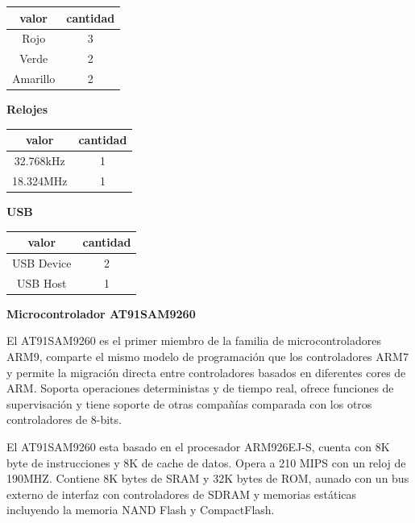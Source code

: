 \begin{center}
\begin{tabular}{|c|c|}
\hline
\hline
\normalsize valor & \normalsize cantidad\\
\hline
\normalsize Rojo & \normalsize 3\\
\hline
\normalsize Verde & \normalsize 2\\
\hline
\normalsize Amarillo & \normalsize 2\\
\hline
\end{tabular}
\end{center}

\textbf{Relojes}

\begin{center}
\begin{tabular}{|c|c|}
\hline
\hline
\normalsize valor & \normalsize cantidad\\
\hline
\normalsize 32.768kHz & \normalsize 1\\
\hline
\normalsize 18.324MHz & \normalsize 1\\
\hline
\end{tabular}
\end{center}

\textbf{USB}

\begin{center}
\begin{tabular}{|c|c|}
\hline
\hline
\normalsize valor & \normalsize cantidad\\
\hline
\normalsize USB Device & \normalsize 2\\
\hline
\normalsize USB Host & \normalsize 1\\
\hline
\end{tabular}
\end{center}

\textbf{Microcontrolador AT91SAM9260}\medskip

El AT91SAM9260 es el primer miembro de la familia de microcontroladores ARM9, comparte el mismo modelo de programación que los controladores ARM7 y permite la migración directa entre controladores basados en diferentes cores de ARM.  Soporta operaciones deterministas y de tiempo real, ofrece funciones de supervisación y tiene soporte de otras compañías comparada con los otros controladores de 8-bits.\medskip \cite{at91}

El AT91SAM9260 esta basado en el procesador ARM926EJ-S, cuenta con 8K byte de instrucciones y 8K de cache de datos. Opera a 210 MIPS con un reloj de 190MHZ. Contiene 8K bytes de SRAM y 32K bytes de ROM, aunado con un bus externo de interfaz con controladores de SDRAM y memorias estáticas incluyendo la memoria NAND Flash y CompactFlash.\medskip

